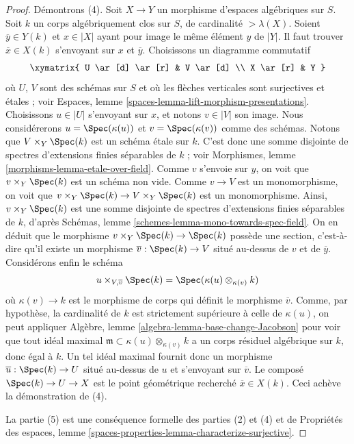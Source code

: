 \begin{proof}
\medskip\noindent
Démontrons (4). Soit $X \to Y$ un morphisme d'espaces algébriques sur $S$.
Soit $k$ un corps algébriquement clos sur $S$, de cardinalité
$> \lambda(X)$. Soient $\overline{y} \in Y(k)$ et $x \in |X|$ ayant pour image le
même élément $y$ de $|Y|$.
Il faut trouver $\overline{x} \in X(k)$ s'envoyant sur $x$ et $\overline{y}$.
Choisissons un diagramme commutatif
$$
\xymatrix{
U \ar[d] \ar[r] & V \ar[d] \\
X \ar[r] & Y
}
$$
où $U$, $V$ sont des schémas sur $S$ et où les flèches verticales sont surjectives
et étales ; voir
Espaces, lemme \ref{spaces-lemma-lift-morphism-presentations}.
Choisissons $u \in |U|$ s'envoyant sur $x$, et notons $v \in |V|$ son image.
Nous considérerons $u = \Spec(\kappa(u))$ et
$v = \Spec(\kappa(v))$ comme des schémas.
Notons que $V \times_Y \Spec(k)$ est un schéma étale sur $k$.
C'est donc une somme disjointe de spectres d'extensions finies
séparables de $k$ ; voir
Morphismes, lemme \ref{morphisms-lemma-etale-over-field}.
Comme $v$ s'envoie sur $y$, on voit que $v \times_Y \Spec(k)$ est un
schéma non vide. Comme $v \to V$ est un monomorphisme, on voit que
$v \times_Y \Spec(k) \to V \times_Y \Spec(k)$
est un monomorphisme. Ainsi, $v \times_Y \Spec(k)$ est une somme
disjointe de spectres d'extensions finies séparables de $k$, d'après
Schémas, lemme \ref{schemes-lemma-mono-towards-spec-field}.
On en déduit que le morphisme
$v \times_Y \Spec(k) \to \Spec(k)$
possède une section, c'est-à-dire qu'il existe un morphisme
$\overline{v} : \Spec(k) \to V$ situé au-dessus de $v$ et de
$\overline{y}$. Considérons enfin le schéma
$$
u \times_{V, \overline{v}} \Spec(k)
=
\Spec(\kappa(u) \otimes_{\kappa(v)} k)
$$
où $\kappa(v) \to k$ est le morphisme de corps qui définit le morphisme
$\overline{v}$. Comme, par hypothèse, la cardinalité de $k$ est strictement supérieure à celle
de $\kappa(u)$, on peut appliquer
Algèbre, lemme \ref{algebra-lemma-base-change-Jacobson}
pour voir que tout idéal maximal
$\mathfrak m \subset \kappa(u) \otimes_{\kappa(v)} k$
a un corps résiduel algébrique sur $k$, donc égal à $k$.
Un tel idéal maximal fournit donc un morphisme
$\overline{u} : \Spec(k) \to U$ situé au-dessus de $u$ et s'envoyant sur
$\overline{v}$. Le composé $\Spec(k) \to U \to X$
est le point géométrique recherché $\overline{x} \in X(k)$.
Ceci achève la démonstration de (4).

\medskip\noindent
La partie (5) est une conséquence formelle des parties (2) et (4) et de
Propriétés des espaces,
lemme \ref{spaces-properties-lemma-characterize-surjective}.
\end{proof}








